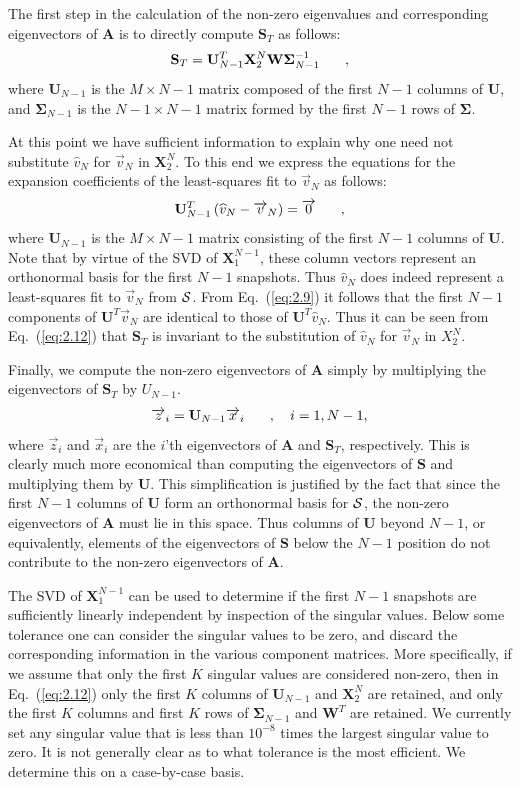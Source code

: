 \documentclass[12pt]{article}
\newcommand{\fn}[1]{\left( #1 \right)}
\renewcommand{\vec}[1]{\overrightarrow{#1}}
\newcommand{\be}{\begin{equation}}
\newcommand{\ee}{\end{equation}}
\newcommand{\pec}{\hspace{0.25in},}
\newcommand{\LEQ}[1]{\label{eq:#1}}
\newcommand{\EQ}[1]{Eq.~(\ref{eq:#1})}
\newcommand{\cS}{{\cal S}}
\newcommand{\mA}{\mathbf{A}}
\newcommand{\mX}{\mathbf{X}}
\newcommand{\mU}{\mathbf{U}}
\newcommand{\mW}{\mathbf{W}}
\newcommand{\mSigma}{\mathbf{\Sigma}}
\newcommand{\mS}{\mathbf{S}}
\begin{document}
The first step in the calculation of the non-zero eigenvalues and corresponding eigenvectors of $\mA$ is to directly 
compute $\mS_T$ as follows:
\be
\mS_T = \mU_{N-1}^{T} \mX_{2}^{N}\mW\mSigma^{-1}_{N-1} \pec
\LEQ{2.12}
\ee
where $\mU_{N-1}$ is the $M \times N-1$ matrix composed of the first $N-1$ columns of $\mU$, and $\mSigma_{N-1}$ is the 
$N-1 \times N-1$ matrix formed by the first $N-1$ rows of $\mSigma$.  

At this point we have sufficient information to explain why one need not substitute $\widehat{v}_N$ for $\vec{v}_N$ in 
$\mX_2^{N}$.  To this end we express the equations for the expansion coefficients of the least-squares fit to $\vec{v}_N$ 
as follows:
\be
\mU^T_{N-1}\fn{\widehat{v}_N - \vec{v}_N} = \vec{0} \pec
\LEQ{2.9}
\ee
where $\mU_{N-1}$ is the $M \times N-1$ matrix consisting of the first $N-1$ columns of $\mU$. Note that by virtue of the 
SVD of $\mX_{1}^{N-1}$, these column vectors represent an orthonormal basis for the first $N-1$ snapshots.  Thus $\widehat{v}_N$ 
does indeed represent a least-squares fit to $\vec{v}_N$ from $\cS$.  From \EQ{2.9} it follows that the first $N-1$ components of 
$\mU^T \vec{v}_N$ are identical to those of $\mU^T \widehat{v}_N$. Thus it can be seen from \EQ{2.12} that $\mS_T$ is 
invariant to the substitution of $\widehat{v}_N$ for $\vec{v}_N$ in $X_{2}^{N}$.

Finally, we compute the non-zero eigenvectors of $\mA$ simply by multiplying the eigenvectors of $\mS_T$ by $U_{N-1}$. 
\be
\vec{z}_i = \mU_{N-1} \vec{x}_i \pec \quad i=1,N-1,
\LEQ{2.13}
\ee
where $\vec{z}_i$ and $\vec{x}_i$ are the $i$'th eigenvectors of $\mA$ and $\mS_T$, respectively.  This is clearly much more 
economical than computing the eigenvectors of $\mS$ and multiplying them by $\mU$.  This simplification is justified by the fact 
that since the first $N-1$ columns of $\mU$ form an orthonormal basis for $\cS$, the non-zero eigenvectors of $\mA$ 
must lie in this space.  Thus columns of $\mU$ beyond $N-1$, or equivalently, elements of the eigenvectors of $\mS$ below the 
$N-1$ position do not contribute to the non-zero eigenvectors of $\mA$. 

The SVD of $\mX_{1}^{N-1}$ can be used to determine if the first $N-1$ snapshots are sufficiently linearly independent by 
inspection of the singular values.  Below some tolerance one can consider the singular values to be zero, and discard the 
corresponding information in the various component matrices.  More specifically, if we assume that only the first $K$ 
singular values are considered non-zero, then in \EQ{2.12} only the first $K$ columns of $\mU_{N-1}$ and $\mX_{2}^{N}$ are retained, 
and only the first $K$ columns and first $K$ rows of $\mSigma_{N-1}$ and $\mW^T$ are retained.  We currently set any singular 
value that is less than $10^{-8}$ times the largest singular value to zero. It is not generally clear as to what tolerance is 
the most efficient.  We determine this on a case-by-case basis.
\end{document}
